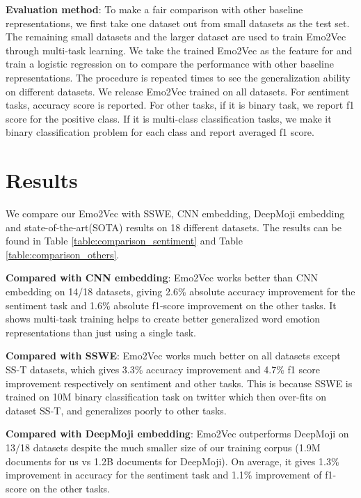 \documentclass[11pt,a4paper]{article}
\begin{document}
\noindent\textbf{Evaluation method}: To make a fair comparison with other baseline representations, we first take one dataset  out from  small datasets as the test set. The remaining  small datasets and the larger dataset are used to train Emo2Vec through multi-task learning. We take the trained Emo2Vec as the feature for  and train a logistic regression on  to compare the performance with other baseline representations. The procedure is repeated  times to see the generalization ability on different datasets. We release Emo2Vec trained on all datasets.  For sentiment tasks, accuracy score is reported. For other tasks,  if it is binary task, we report f1 score for the positive class. If it is multi-class classification tasks, we make it binary classification problem for each class and report averaged f1 score. 




\section{Results}

We compare our Emo2Vec with SSWE, CNN embedding, DeepMoji embedding  and state-of-the-art(SOTA) results on 18 different datasets. The results can be found in Table \ref{table:comparison_sentiment} and 
Table \ref{table:comparison_others}.


\noindent\textbf{Compared with CNN embedding}: Emo2Vec works better than CNN embedding on 14/18 datasets,  giving 2.6\% absolute accuracy improvement for the sentiment task  and 1.6\% absolute f1-score improvement  on the other tasks. It shows multi-task training helps to create better generalized word emotion representations than just using a single task. 

\noindent\textbf{Compared with SSWE}: Emo2Vec works much better on all datasets except SS-T datasets, which gives 3.3\% accuracy improvement  and 4.7\% f1 score improvement respectively on sentiment and other tasks. This is because SSWE is trained on 10M binary classification task on twitter which then over-fits on dataset SS-T, and generalizes poorly to  other tasks. 

\noindent\textbf{Compared with DeepMoji embedding}: Emo2Vec outperforms DeepMoji on 13/18 datasets despite the much smaller size of our training corpus (1.9M documents for us vs 1.2B documents for DeepMoji). On average, it gives 1.3\% improvement in accuracy for the sentiment task  and 1.1\% improvement of f1-score on the other tasks. 
\end{document}
